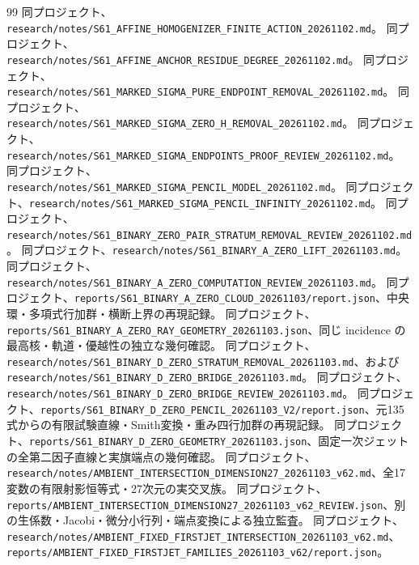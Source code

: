 \documentclass[11pt,a4paper]{ltjsarticle}
\theoremstyle{remark}
\begin{document}
\begin{thebibliography}{99}
 同プロジェクト、\nolinkurl{research/notes/S61_AFFINE_HOMOGENIZER_FINITE_ACTION_20261102.md}。
 同プロジェクト、\nolinkurl{research/notes/S61_AFFINE_ANCHOR_RESIDUE_DEGREE_20261102.md}。
 同プロジェクト、\nolinkurl{research/notes/S61_MARKED_SIGMA_PURE_ENDPOINT_REMOVAL_20261102.md}。
 同プロジェクト、\nolinkurl{research/notes/S61_MARKED_SIGMA_ZERO_H_REMOVAL_20261102.md}。
 同プロジェクト、\nolinkurl{research/notes/S61_MARKED_SIGMA_ENDPOINTS_PROOF_REVIEW_20261102.md}。
 同プロジェクト、\nolinkurl{research/notes/S61_MARKED_SIGMA_PENCIL_MODEL_20261102.md}。
 同プロジェクト、\nolinkurl{research/notes/S61_MARKED_SIGMA_PENCIL_INFINITY_20261102.md}。
 同プロジェクト、\nolinkurl{research/notes/S61_BINARY_ZERO_PAIR_STRATUM_REMOVAL_REVIEW_20261102.md}。
 同プロジェクト、\nolinkurl{research/notes/S61_BINARY_A_ZERO_LIFT_20261103.md}。
 同プロジェクト、\nolinkurl{research/notes/S61_BINARY_A_ZERO_COMPUTATION_REVIEW_20261103.md}。
 同プロジェクト、\nolinkurl{reports/S61_BINARY_A_ZERO_CLOUD_20261103/report.json}、中央環・多項式行加群・横断上界の再現記録。
 同プロジェクト、\nolinkurl{reports/S61_BINARY_A_ZERO_RAY_GEOMETRY_20261103.json}、同じ incidence の最高核・軌道・優越性の独立な幾何確認。
 同プロジェクト、\nolinkurl{research/notes/S61_BINARY_D_ZERO_STRATUM_REMOVAL_20261103.md}、および\nolinkurl{research/notes/S61_BINARY_D_ZERO_BRIDGE_20261103.md}。
 同プロジェクト、\nolinkurl{research/notes/S61_BINARY_D_ZERO_BRIDGE_REVIEW_20261103.md}。
 同プロジェクト、\nolinkurl{reports/S61_BINARY_D_ZERO_PENCIL_20261103_V2/report.json}、元135式からの有限試験直線・Smith変換・重み四行加群の再現記録。
 同プロジェクト、\nolinkurl{reports/S61_BINARY_D_ZERO_GEOMETRY_20261103.json}、固定一次ジェットの全第二因子直線と実旗端点の幾何確認。
 同プロジェクト、\nolinkurl{research/notes/AMBIENT_INTERSECTION_DIMENSION27_20261103_v62.md}、全17変数の有限射影恒等式・27次元の実交叉族。
 同プロジェクト、\nolinkurl{reports/AMBIENT_INTERSECTION_DIMENSION27_20261103_v62_REVIEW.json}、別の生係数・Jacobi・微分小行列・端点変換による独立監査。
 同プロジェクト、\nolinkurl{research/notes/AMBIENT_FIXED_FIRSTJET_INTERSECTION_20261103_v62.md}、\nolinkurl{reports/AMBIENT_FIXED_FIRSTJET_FAMILIES_20261103_v62/report.json}。

\end{thebibliography}
\end{document}
